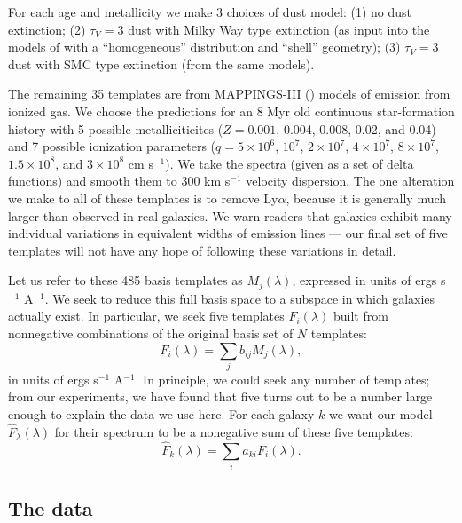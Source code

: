 \documentclass[12pt,preprint]{aastex}
\renewcommand{\AA}{A}
\begin{document}
For each age and metallicity we make 3 choices of dust model: (1) no
dust extinction; (2) $\tau_V = 3$ dust with Milky Way type extinction
(as input into the models of \citealt{witt00a} with a ``homogeneous''
distribution and ``shell'' geometry); (3) $\tau_V = 3$ dust with SMC
type extinction (from the same models).

The remaining 35 templates are from MAPPINGS-III (\citealt{kewley01a})
models of emission from ionized gas. We choose the predictions for an
8 Myr old continuous star-formation history with 5 possible
metalliciticites ($Z=0.001$, 0.004, 0.008, 0.02, and 0.04) and 7
possible ionization parameters ($q= 5\times 10^6$, $10^7$, $2\times
10^7$, $4\times 10^7$, $8 \times 10^7$, $1.5\times 10^8$, and $3\times
10^8$ cm s$^{-1}$). We take the spectra (given as a set of delta
functions) and smooth them to $300$ km s$^{-1}$ velocity
dispersion. The one alteration we make to all of these templates is to
remove Ly$\alpha$, because it is generally much larger than observed
in real galaxies. We warn readers that galaxies exhibit many
individual variations in equivalent widths of emission lines --- our
final set of five templates will not have any hope of following these
variations in detail.

Let us refer to these 485 basis templates as $M_{j}(\lambda)$,
expressed in units of ergs s$^{-1}$ \AA$^{-1}$.  We seek to reduce
this full basis space to a subspace in which galaxies actually
exist. In particular, we seek five templates $F_{i}(\lambda)$ built
from nonnegative combinations of the original basis set of $N$
templates:
\begin{equation}
F_{i}(\lambda) = \sum_j b_{ij} M_{j}(\lambda),
\end{equation}
in units of ergs s$^{-1}$ \AA$^{-1}$. In principle, we could seek any
number of templates; from our experiments, we have found that five
turns out to be a number large enough to explain the data we use
here. For each galaxy $k$ we want our model
${\hat{F}_\lambda}(\lambda)$ for their spectrum to be a nonegative sum
of these five templates:
\begin{equation}
{\hat{F}}_{k}(\lambda) = \sum_i a_{ki} F_{i}(\lambda).
\end{equation}

\subsection{The data}
\label{data}
\end{document}
